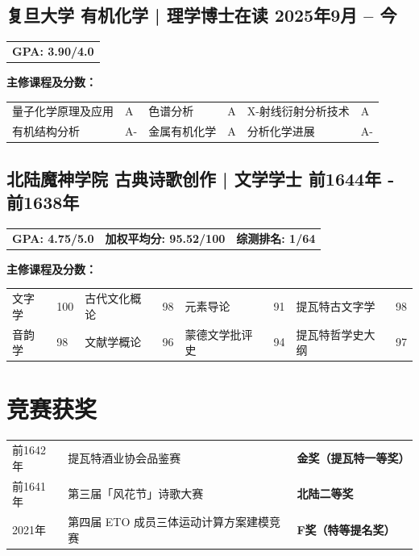 \documentclass[12.5pt]{article}
\newcommand{\mysection}[2]{
  \section{%
    \makebox[\widthof{\faGraduationCap}][c]{\color{My_Red} #1}%
    \quad #2%
  }%
}
\begin{document}
        \subsection{ 复旦大学 \qquad 有机化学 | 理学博士在读 \hfill 2025年9月 -- 今}        
            \begin{table}[h!]
                \begin{tabularx}{\textwidth}{X}
                    \textbf{GPA: 3.90/4.0 }
                \end{tabularx}
            \end{table}
            \qquad\textbf{主修课程及分数：}
            \begin{table}[h!]
                \centering
                \begin{tabular}{ p{4cm} p{} p{4cm} p{} p{4cm} p{}}
                    量子化学原理及应用 & A & 色谱分析   & A & X-射线衍射分析技术 & A \\
                    有机结构分析 & A- & 金属有机化学 & A & 分析化学进展   & A-
                \end{tabular}
            \end{table}
        \subsection{ 北陆魔神学院 \qquad 古典诗歌创作 | 文学学士 \hfill 前1644年 - 前1638年}
            \begin{table}[h!]
                \begin{tabularx}{\textwidth}{XXX}
                    \textbf{GPA: 4.75/5.0 }& \textbf{加权平均分: 95.52/100}  & \textbf{综测排名: 1/64}
                \end{tabularx}
            \end{table}
            \qquad\textbf{主修课程及分数：}
            \begin{table}[h!]
                \centering
                \begin{tabular}{ p{2cm} p{} p{3cm} p{} p{3.5cm} p{} p{4cm} p{}}
                    文字学 & 100 & 古代文化概论   & 98 & 元素导论 & 91 & 提瓦特古文字学 & 98 \\
                    音韵学 & 98 & 文献学概论    & 96 & 蒙德文学批评史 & 94 & 提瓦特哲学史大纲   & 97 
                \end{tabular}
            \end{table}

    \mysection{\faTrophy}{竞赛获奖}
    \begin{table}[h!]
        \begin{tabularx}{\textwidth}{p{}Xp{}}
            前1642年 & 提瓦特酒业协会品鉴赛       & \textbf{金奖（提瓦特一等奖）}        \\
            前1641年 & 第三届「风花节」诗歌大赛         & \textbf{北陆二等奖}        \\
            2021年 & 第四届 ETO 成员三体运动计算方案建模竞赛          & \textbf{F奖（特等提名奖）}
        \end{tabularx}
    \end{table}
    
\end{document}
